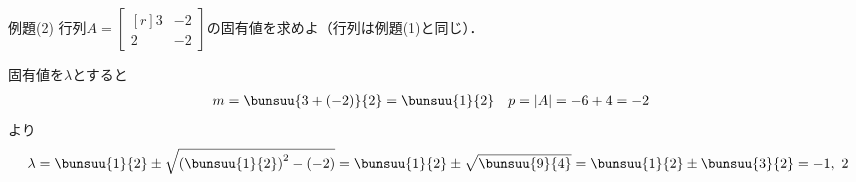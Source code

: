 \begin{tip}{例題(2)}
	行列$A = 
	\begin{bmatrix*}[r]
		3 & -2\\ 2 & -2
	\end{bmatrix*}$の固有値を求めよ（行列は例題(1)と同じ）．

	\tcblower

	固有値を$\lambda$とすると
	\begin{align*}
		&m = \bunsuu{3 + (-2)}{2} = \bunsuu{1}{2} & &p = |A| = -6 + 4 = -2
	\end{align*}
	より
	\begin{equation*}
		\lambda = \bunsuu{1}{2} \pm \sqrt{\left(\bunsuu{1}{2}\right)^2 - (-2)} = \bunsuu{1}{2} \pm \sqrt{\bunsuu{9}{4}} = \bunsuu{1}{2} \pm \bunsuu{3}{2} = -1,\ 2 
	\end{equation*}
\end{tip}